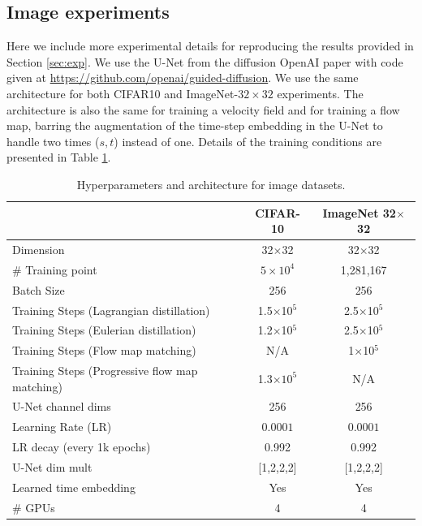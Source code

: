 \subsection{Image experiments}

Here we include more experimental details for reproducing the results provided in Section \ref{sec:exp}. We use the U-Net from the diffusion OpenAI paper \citep{dhariwal_diffusion_2021} with code given at \href{https://github.com/openai/guided-diffusion}{https://github.com/openai/guided-diffusion}. We use the same architecture for both CIFAR10 and ImageNet-$32\times32$ experiments. The architecture is also the same for training a velocity field and for training a flow map, barring the augmentation of the time-step embedding in the U-Net to handle two times ($s,t$) instead of one. Details of the training conditions are presented in Table \ref{tab:archs:img}.


\begin{table}[ht]
	\centering
	\begin{tabular}{lcc}
		\toprule                                       & CIFAR-10          & ImageNet 32$\times$32 \\
		\midrule Dimension                             & 32$\times$32      & 32$\times$32          \\
		\# Training point                              & $5\times 10^4$    & 1,281,167             \\
		\midrule Batch Size                            & 256               & 256                   \\
		Training Steps (Lagrangian distillation)       & 1.5$\times$10$^5$ & 2.5$\times$10$^5$     \\
		Training Steps (Eulerian distillation)         & 1.2$\times$10$^5$ & 2.5$\times$10$^5$     \\
		Training Steps (Flow map matching)             & N/A               & 1$\times$10$^5$       \\
		Training Steps (Progressive flow map matching) & 1.3$\times 10^5$  & N/A                   \\
		U-Net channel dims                             & 256               & 256                   \\
		Learning Rate (LR)                             & $0.0001$          & $0.0001$              \\
		LR decay (every 1k epochs)                     & 0.992             & 0.992                 \\
		U-Net dim mult                                 & [1,2,2,2]         & [1,2,2,2]             \\
		Learned time  embedding                        & Yes               & Yes                   \\
		$\#$ GPUs                                      & 4                 & 4                     \\
		\bottomrule
	\end{tabular}
	\vspace{2.5mm}
	\caption{Hyperparameters and architecture for image datasets.}
	\label{tab:archs:img}
\end{table}

